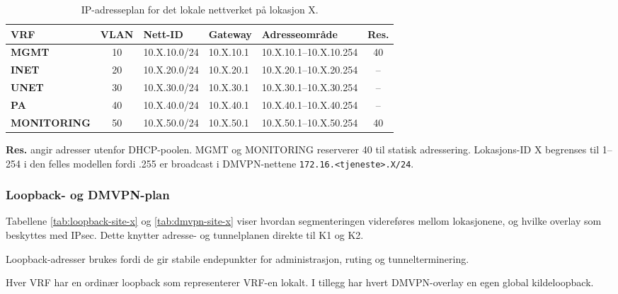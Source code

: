 \begin{table}[H]
    \centering
    \caption{IP-adresseplan for det lokale nettverket på lokasjon X.}
    \label{tab:ipplan-site-x}
    \small
    \renewcommand{\arraystretch}{1.3}
    \setlength{\tabcolsep}{4pt}
    \begin{tabular}{
        >{\bfseries}l
        c
        l
        l
        l
        c
    }
        \toprule
        \rowcolor{tablegreen}
        \color{white}\textbf{VRF} &
        \color{white}\textbf{VLAN} &
        \color{white}\textbf{Nett-ID} &
        \color{white}\textbf{Gateway} &
        \color{white}\textbf{Adresseområde} &
        \color{white}\textbf{Res.} \\
        \midrule
        MGMT       & 10 & 10.X.10.0/24 & 10.X.10.1 & 10.X.10.1--10.X.10.254 & 40 \\
        INET       & 20 & 10.X.20.0/24 & 10.X.20.1 & 10.X.20.1--10.X.20.254 & -- \\
        UNET       & 30 & 10.X.30.0/24 & 10.X.30.1 & 10.X.30.1--10.X.30.254 & -- \\
        PA         & 40 & 10.X.40.0/24 & 10.X.40.1 & 10.X.40.1--10.X.40.254 & -- \\
        MONITORING & 50 & 10.X.50.0/24 & 10.X.50.1 & 10.X.50.1--10.X.50.254 & 40 \\
        \bottomrule
    \end{tabular}
\end{table}
\noindent
\textbf{Res.} angir adresser utenfor DHCP-poolen. MGMT og MONITORING reserverer 40 til statisk adressering. Lokasjons-ID X begrenses til 1--254 i den felles modellen fordi .255 er broadcast i DMVPN-nettene \texttt{172.16.<tjeneste>.X/24}.

\subsubsection{Loopback- og DMVPN-plan}
Tabellene \ref{tab:loopback-site-x} og \ref{tab:dmvpn-site-x} viser hvordan segmenteringen videreføres mellom lokasjonene, og hvilke overlay som beskyttes med IPsec. Dette knytter adresse- og tunnelplanen direkte til K1 og K2.

Loopback-adresser brukes fordi de gir stabile endepunkter for administrasjon, ruting og tunnelterminering.

Hver VRF har en ordinær loopback som representerer VRF-en lokalt. I tillegg har hvert DMVPN-overlay en egen global kildeloopback.


